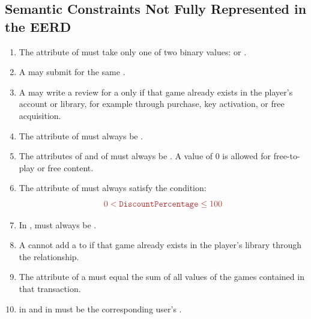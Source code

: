 \subsection{Semantic Constraints Not Fully Represented in the EERD}

\begin{enumerate}
    \item The attribute  of  must take only one of two binary values:  or .

    \item A  may submit  for the same .

    \item A  may write a review for a  only if that game already exists in the player's account or library, for example through purchase, key activation, or free acquisition.

    \item The attribute  of  must always be .

    \item The attributes  of  and  of  must always be . A value of 0 is allowed for free-to-play or free content.

    \item The attribute  of  must always satisfy the condition:
    \[
    \rulehl{0 < \texttt{DiscountPercentage} \leq 100}
    \]

    \item In ,  must always be  .

    \item A  cannot add a  to  if that game already exists in the player's library through the  relationship.

    \item The attribute  of a  must equal the sum of all  values of the games contained in that transaction.

    \item {} in  and  in  must be  the corresponding user's .


\end{enumerate}
